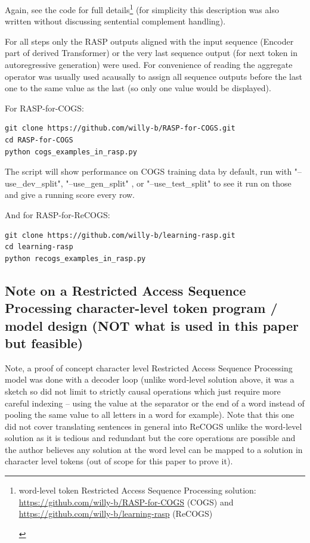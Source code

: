 \documentclass[11pt]{article}
\begin{document}
Again, see the code for full details\footnote{\begin{footnotesize}word-level token Restricted Access Sequence Processing solution: \href{https://github.com/willy-b/RASP-for-COGS}{https://github.com/willy-b/RASP-for-COGS} (COGS) and \href{https://github.com/willy-b/learning-rasp}{https://github.com/willy-b/learning-rasp} (ReCOGS) \end{footnotesize}} (for simplicity this description was also written without discussing sentential complement handling).

For all steps only the RASP outputs aligned with the input sequence (Encoder part of derived Transformer) or the very last sequence output (for next token in autoregressive generation) were used. For convenience of reading the aggregate operator was usually used acausally to assign all sequence outputs before the last one to the same value as the last (so only one value would be displayed).

For RASP-for-COGS:
\begin{tiny}
\begin{verbatim}
git clone https://github.com/willy-b/RASP-for-COGS.git
cd RASP-for-COGS
python cogs_examples_in_rasp.py
\end{verbatim}
\end{tiny}

The script will show performance on COGS training data by default, run with "--use\_dev\_split", "--use\_gen\_split" , or "--use\_test\_split" to see it run on those and give a running score every row.

And for RASP-for-ReCOGS:
\begin{tiny}
\begin{verbatim}
git clone https://github.com/willy-b/learning-rasp.git
cd learning-rasp
python recogs_examples_in_rasp.py 
\end{verbatim}
\end{tiny}

\clearpage


\subsection{Note on a Restricted Access Sequence Processing character-level token program / model design (NOT what is used in this paper but feasible)}
\label{rasp_character_level_model_notes}

Note, a proof of concept character level Restricted Access Sequence Processing model was done with a decoder loop (unlike word-level solution above, it was a sketch so did not limit to strictly causal operations which just require more careful indexing -- using the value at the separator or the end of a word instead of pooling the same value to all letters in a word for example). Note that this one did not cover translating sentences in general into ReCOGS unlike the word-level solution as it is tedious and redundant but the core operations are possible and the author believes any solution at the word level can be mapped to a solution in character level tokens (out of scope for this paper to prove it).
\end{document}
